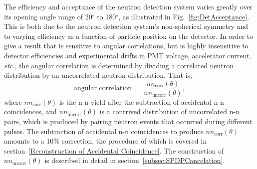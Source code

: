 
The efficiency and acceptance of the neutron detection system varies greatly over its opening angle range of 20$^{\circ}$ to 180$^{\circ}$, as illustrated in Fig.~\ref{fig:DetAcceptance}.
This is both due to the neutron detection system's non-spherical symmetry and to varying efficiency as a function of particle position on the detector.
In order to give a result that is sensitive to angular correlations, but is highly insensitive to detector efficiencies and experimental drifts in PMT voltage, accelerator current, \emph{etc}., the angular correlation is determined by dividing a correlated neutron distribution by an uncorrelated neutron distribution. That is,
\begin{equation}
\label{eq:angularCorr}
\text{angular correlation }  = \frac{nn_{\text{corr}}(\theta)}{nn_{\text{uncorr}}(\theta)},
\end{equation}
where $nn_{\text{corr}}(\theta)$ is the n-n yield after the subtraction of accidental n-n coincidences, and $nn_{\text{uncorr}}(\theta)$ is a contrived distribution of uncorrelated n-n pairs, which is produced by pairing neutron events that occurred during different pulses.
The subtraction of accidental n-n coincidences to produce $nn_{\text{corr}}(\theta)$ amounts to a 10\% correction, the procedure of which is covered in section~\ref{Reconstruction of Accidental Coincidence}. The construction of $nn_{\text{uncorr}}(\theta)$ is described in detail in section~\ref{subsec:SPDPCancelation}.


